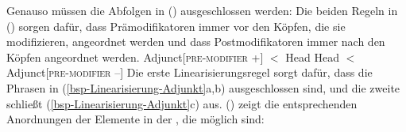 Genauso müssen die Abfolgen in () ausgeschlossen werden:
\eal
\label{bsp-Linearisierung-Adjunkt}
\zl
Die beiden Regeln in () sorgen dafür, dass Prämodifikatoren immer vor den Köpfen, die sie modifizieren,
angeordnet werden und dass Postmodifikatoren immer nach den Köpfen angeordnet werden.
\eal
\label{lp-head-argument-initial}
\ex Adjunct[\textsc{pre-modifier} +] $<$ Head
\ex Head $<$ Adjunct[\textsc{pre-modifier} --]
\zl
Die erste Linearisierungsregel sorgt dafür, dass die Phrasen in (\ref{bsp-Linearisierung-Adjunkt}a,b) ausgeschlossen sind, und die zweite
schließt (\ref{bsp-Linearisierung-Adjunkt}c) aus. () zeigt die entsprechenden Anordnungen der
Elemente in der \dtrsl, die möglich sind:
\eal
\ex {}
\ex {}
\zl


